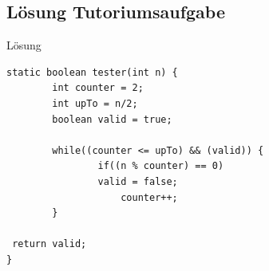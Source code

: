 \documentclass[18pt]{beamer}
\begin{document}
\subsection{Lösung Tutoriumsaufgabe}
\begin{frame}[fragile]{Lösung}
\begin{lstlisting}
static boolean tester(int n) {
		int counter = 2;
		int upTo = n/2;
		boolean valid = true;
		
		while((counter <= upTo) && (valid)) {
				if((n % counter) == 0)
				valid = false;
					counter++;
		}
		
 return valid;
}
\end{lstlisting}
\end{frame}



\appendix
\beginbackup


\backupend
\end{document}
